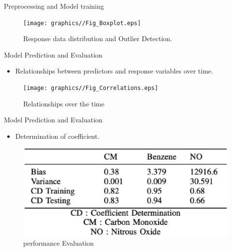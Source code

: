 \documentclass[
 size=14pt,
 paper=smartboard,  %
 mode=present, 		%
 display=slides, 	%
 style=tuliplab,  	%
 pauseslide,
 fleqn,leqno]{powerdot}
\begin{document}
\begin{slide}[toc=,bm=]{Preprocessing and Model training}
  
  {
 


  }
  {
    \begin{figure}
      \texttt{[image: graphics//Fig\_Boxplot.eps]}
      \caption{Response data distribution and Outlier Detection.} \label{Bias}
   \end{figure}
  }
  

  
  \end{slide}

\begin{slide}{ Model Prediction and Evaluation}
  \begin{itemize}
  \item
  Relationships between predictors and response variables over time.
  
  \end{itemize}
  
  
  \begin{figure}
    \texttt{[image: graphics//Fig\_Correlations.eps]}
    \caption{Relationships over the time} \label{Bias}
  \end{figure}
  \end{slide}
\begin{slide}{ Model Prediction and Evaluation}
\begin{itemize}
\item
Determination of coefficient.

\end{itemize}


\begin{figure}
  \includegraphics[width=0.9\linewidth,height=0.4\linewidth]{graphics//Evaluation.eps}
  \caption{performance Evaluation} \label{Bias}
\end{figure}
\end{slide}
\end{document}
